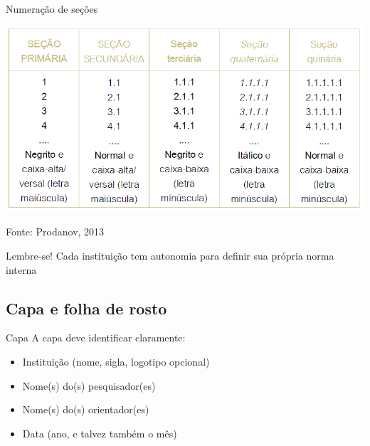 \documentclass{beamer}
\begin{document}
\begin{frame}{Numeração de seções}
  \begin{center}
    \includegraphics[width=\textwidth]{ProjetoII/secoes}
  \end{center}

  \vfill
  Fonte: Prodanov, 2013
\end{frame}

\begin{frame}{}
  \begin{block}{Lembre-se!}
    Cada instituição tem autonomia para definir sua própria norma interna
  \end{block}
\end{frame}

\subsection{Capa e folha de rosto}

\begin{frame}{Capa}
A capa deve identificar claramente:
  \begin{itemize}
  \item Instituição (nome, sigla, logotipo opcional)
  \item Nome(s) do(s) pesquisador(es)
  \item Nome(s) do(s) orientador(es)
  \item Data (ano, e talvez também o mês)
  \end{itemize}
\end{frame}
\end{document}
